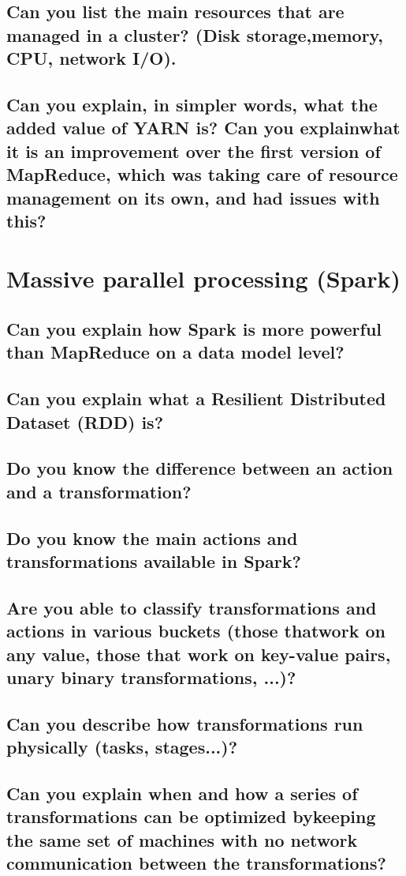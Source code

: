 \documentclass{article}
\begin{document}
\subsection{Can you list the main resources that are managed in a cluster? (Disk storage,memory, CPU, network I/O).}
\subsection{Can you explain, in simpler words, what the added value of YARN is? Can you explainwhat it is an improvement over the first version of MapReduce, which was taking care of resource management on its own, and had issues with this?}

\pagebreak

\section{Massive parallel processing (Spark)}
\subsection{Can you explain how Spark is more powerful than MapReduce on a data model level?}
\subsection{Can you explain what a Resilient Distributed Dataset (RDD) is?}
\subsection{Do you know the difference between an action and a transformation?}
\subsection{Do you know the main actions and transformations available in Spark?}
\subsection{Are you able to classify transformations and actions in various buckets (those thatwork on any value, those that work on key-value pairs, unary binary transformations, ...)?}
\subsection{Can you describe how transformations run physically (tasks, stages...)?}
\subsection{Can you explain when and how a series of transformations can be optimized bykeeping the same set of machines with no network communication between the transformations?}
\end{document}
